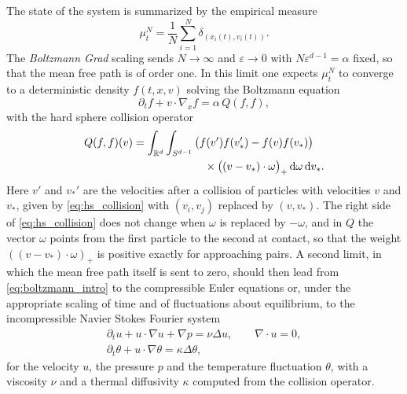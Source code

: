 The state of the system is summarized by the empirical measure
\[
\mu^N_t = \frac{1}{N}\sum_{i=1}^N \delta_{(x_i(t), v_i(t))}.
\]
The \emph{Boltzmann Grad} scaling sends $N\to\infty$ and $\varepsilon\to 0$ with $N\varepsilon^{d-1} = \alpha$ fixed, so that the mean free path is of order one. In this limit one expects $\mu^N_t$ to converge to a deterministic density $f(t,x,v)$ solving the Boltzmann equation
\begin{equation}
\partial_t f + v\cdot\nabla_x f = \alpha\, Q(f,f),
\label{eq:boltzmann_intro}
\end{equation}
with the hard sphere collision operator
\[
\begin{multlined}Q(f,f)(v) = \int_{\R^d}\int_{S^{d-1}} \big(f(v')f(v_*') - f(v)f(v_*)\big)\\ \times\big((v-v_*)\cdot\omega\big)_+ \dd\omega \dd v_* .\end{multlined}
\]
Here $v'$ and $v_*'$ are the velocities after a collision of particles with velocities $v$ and $v_*$, given by \eqref{eq:hs_collision} with $(v_i,v_j)$ replaced by $(v,v_*)$. The right side of \eqref{eq:hs_collision} does not change when $\omega$ is replaced by $-\omega$, and in $Q$ the vector $\omega$ points from the first particle to the second at contact, so that the weight $((v-v_*)\cdot\omega)_+$ is positive exactly for approaching pairs. A second limit, in which the mean free path itself is sent to zero, should then lead from \eqref{eq:boltzmann_intro} to the compressible Euler equations or, under the appropriate scaling of time and of fluctuations about equilibrium, to the incompressible Navier Stokes Fourier system
\begin{equation}
\begin{gathered}
\partial_t u + u\cdot\nabla u + \nabla p = \nu\Delta u,\qquad \nabla\cdot u = 0,\\
\partial_t\theta + u\cdot\nabla\theta = \kappa\Delta\theta,
\end{gathered}
\label{eq:ns_intro}
\end{equation}
for the velocity $u$, the pressure $p$ and the temperature fluctuation $\theta$, with a viscosity $\nu$ and a thermal diffusivity $\kappa$ computed from the collision operator.

